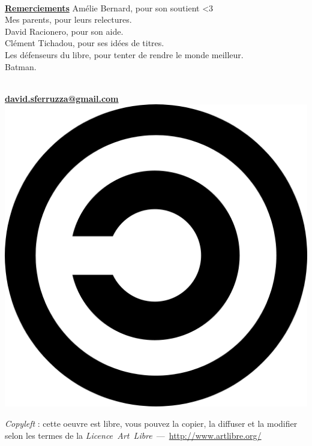 \begin{titlepage}
~\vfill
\begin{center}
\begin{minipage}[c]{15cm}
	\begin{center}
	{\large \textbf{\underline{Remerciements}}}
	\linebreak
	\linebreak
	Amélie Bernard, pour son soutient <3\\
	Mes parents, pour leurs relectures.\\
	David Racionero, pour son aide.\\
	Clément Tichadou, pour ses idées de titres.\\
	Les défenseurs du libre, pour tenter de rendre le monde meilleur.\\
	Batman.
	\end{center}
\end{minipage}

\vspace{240pt}

\begin{minipage}[c]{10cm}
	\begin{center}
	\textbf{\titre}
	\linebreak
	\linebreak
	\moi\\
	\textbf{\href{mailto:david.sferruzza@gmail.com}{david.sferruzza@gmail.com}}
	\linebreak
	\linebreak
	\linebreak
	\linebreak
	\includegraphics[scale=.05]{images/copyleft.png} 
	\end{center}
	\textit{Copyleft} : cette oeuvre est libre, vous pouvez la copier,
	la diffuser et la modifier selon les termes de la
	\textit{Licence~Art~Libre}~---~\url{http://www.artlibre.org/}
\end{minipage}
\end{center}
\vfill ~
\end{titlepage}
